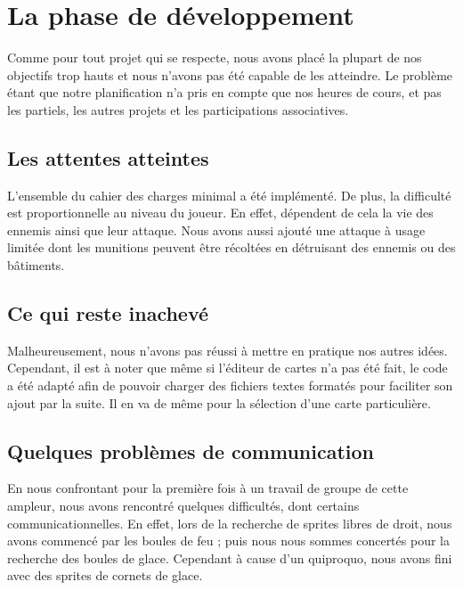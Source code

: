 \section{La phase de développement}

Comme pour tout projet qui se respecte, nous avons placé la plupart de nos objectifs trop hauts et nous n'avons pas été capable de les atteindre. Le problème étant que notre planification n'a pris en compte que nos heures de cours, et pas les partiels, les autres projets et les participations associatives.

\subsection{Les attentes atteintes}

L'ensemble du cahier des charges minimal a été implémenté. De plus, la difficulté est proportionnelle au niveau du joueur. En effet, dépendent de cela la vie des ennemis ainsi que leur attaque. 
Nous avons aussi ajouté une attaque à usage limitée dont les munitions peuvent être récoltées en détruisant des ennemis ou des bâtiments.

\subsection{Ce qui reste inachevé}

Malheureusement, nous n'avons pas réussi à mettre en pratique nos autres idées. Cependant, il est à noter que même si l'éditeur de cartes n'a pas été fait, le code a été adapté afin de pouvoir charger des fichiers textes formatés pour faciliter son ajout par la suite. Il en va de même pour la sélection d'une carte particulière.  

\subsection{Quelques problèmes de communication}
 
En nous confrontant pour la première fois à un travail de groupe de cette ampleur, nous avons rencontré quelques difficultés, dont certains communicationnelles. En effet, lors de la recherche de sprites libres de droit, nous avons commencé par les boules de feu ; puis nous nous sommes concertés pour la recherche des boules de glace. Cependant à cause d'un quiproquo, nous avons fini avec des sprites de cornets de glace. 
